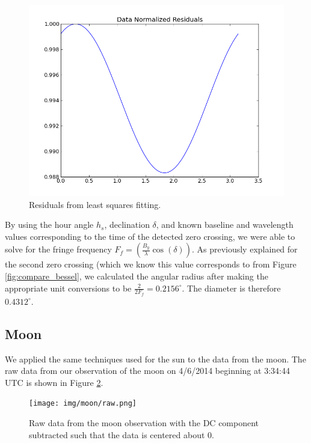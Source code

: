 \documentclass{article}
\begin{document}
    \begin{figure}[h!]
    \centering
    \includegraphics[scale=0.5]{img/sun/data_residual.png}
    \caption{Residuals from least squares fitting.}
    \label{fig:sun_residual}
    \end{figure}

    By using the hour angle $h_s$, declination $\delta$, and known baseline and
    wavelength values corresponding to the time of the detected zero crossing, we
    were able to solve for the fringe frequency $F_{f} = \left
    (\frac{B_{y}}{\lambda}\cos(\delta)\right )$. As previously explained for the
    second zero crossing (which we know this value corresponds to from Figure
    \ref{fig:compare_bessel}, we calculated the angular radius after making the
    appropriate unit conversions to be $\frac{2}{2F_f} = 0.2156^{\circ}$. The
    diameter is therefore $0.4312^{\circ}$.

    \FloatBarrier
\subsection{Moon}
    We applied the same techniques used for the sun to the data from the moon.
    The raw data from our observation of the moon on 4/6/2014 beginning at
    3:34:44 UTC is shown in Figure \ref{fig:raw_moon}.

    \begin{figure}[ht!]
    \centering
    \texttt{[image: img/moon/raw.png]}
    \caption{Raw data from the moon observation with the DC component subtracted
    such that the data is centered about 0.}
    \label{fig:raw_moon}
    \end{figure}
\end{document}
